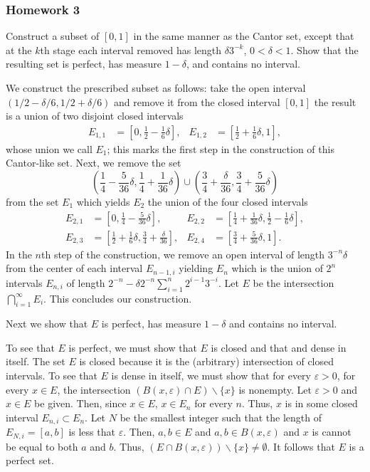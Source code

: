 \subsubsection{Homework 3}
\begin{problem}
  Construct a subset of $[0,1]$ in the same manner as the Cantor set,
  except that at the $k$th stage each interval removed has length
  $\delta 3^{-k}$, $0<\delta<1$. Show that the resulting set is perfect,
  has measure $1-\delta$, and contains no interval.
\end{problem}
\begin{solution}
  We construct the prescribed subset as follows: take the open interval
  $(1/2-\delta/6,1/2+\delta/6)$ and remove it from the closed interval
  $[0,1]$ the result is a union of two disjoint closed intervals
  \[
    \begin{aligned}
    E_{1,1}&=\left[0,\frac{1}{2}-\frac{1}{6}\delta\right],&
    E_{1,2}&=\left[\frac{1}{2}+\frac{1}{6}\delta,1\right],
    \end{aligned}
  \]
  whose union we call $E_1$; this marks the first step in the construction
  of this Cantor-like set. Next, we remove the set
  \[
    \left(\frac{1}{4}-\frac{5}{36}\delta,\frac{1}{4}+\frac{1}{36}\delta\right)
    \cup
    \left(\frac{3}{4}+\frac{\delta}{36},\frac{3}{4}+\frac{5}{36}\delta\right)
  \]
  from the set $E_1$ which yields $E_2$ the union of the four closed
  intervals
  \[
    \begin{aligned}
      E_{2,1}&=\left[0,\frac{1}{4}-\frac{5}{36}\delta\right],&
      E_{2,2}&=\left[\frac{1}{4}+\frac{1}{36}\delta,
        \frac{1}{2}-\frac{1}{6}\delta\right],\\
      E_{2,3}&=\left[\frac{1}{2}+\frac{1}{6}\delta,
        \frac{3}{4}+\frac{\delta}{36}\right],&
      E_{2,4}&=\left[\frac{3}{4}+\frac{5}{36}\delta,1\right].
    \end{aligned}
  \]
  In the $n$th step of the construction, we remove an open interval of
  length $3^{-n}\delta$ from the center of each interval $E_{n-1,i}$
  yielding $E_n$ which is the union of $2^n$ intervals $E_{n,i}$ of length
  $2^{-n}-\delta 2^{-n}\sum_{i=1}^n2^{i-1}3^{-i}$. Let $E$ be the intersection
  $\bigcap_{i=1}^\infty E_i$. This concludes our construction.

  Next we show that $E$ is perfect, has measure $1-\delta$ and contains no
  interval.

  To see that $E$ is perfect, we must show that $E$ is closed and that
  and dense in itself. The set $E$ is closed because it is the (arbitrary)
  intersection of closed intervals. To see that $E$ is dense in itself, we
  must show that for every $\varepsilon>0$, for every $x\in E$, the
  intersection $(B(x,\varepsilon)\cap E)\smallsetminus\{x\}$ is
  nonempty. Let $\varepsilon>0$ and $x\in E$ be given. Then, since
  $x\in E$, $x\in E_n$ for every $n$. Thus, $x$ is in some closed interval
  $E_{n,i}\subset E_n$. Let $N$ be the smallest integer such that the
  length of $E_{N,i}=[a,b]$ is less that $\varepsilon$. Then, $a,b\in E$
  and $a,b\in B(x,\varepsilon)$ and $x$ is cannot be equal to both $a$ and
  $b$. Thus, $(E\cap B(x,\varepsilon))\smallsetminus\{x\}\neq\emptyset$. It
  follows that $E$ is a perfect set.


\end{solution}
